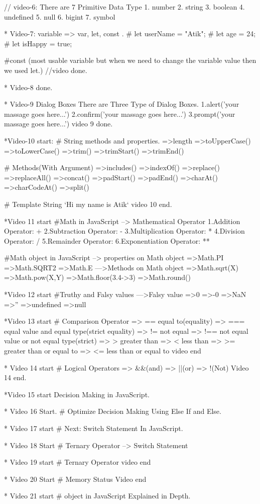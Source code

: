 // video-6: There are 7 Primitive Data Type
1. number
2. string
3. boolean
4. undefined
5. null
6. bigint
7. symbol

* Video-7: 
variable => var, let, const .
# let userName = "Atik";
# let age = 24;
# let isHappy = true;

#const (most usable variable but  when we need to change the variable value then we used let.)
//video done.

* Video-8 done.

* Video-9 
Dialog Boxes
There are Three Type of Dialog Boxes.
1.alert('your massage goes here...')
2.confirm('your massage goes here...')
3.prompt('your massage goes here...')
video 9 done.

*Video-10 start: 
# String methods and properties.
=>length
=>toUpperCase()
=>toLowerCase()
=>trim()
=>trimStart()
=>trimEnd()

# Methods(With Argument)
=>includes()
=>indexOf()
=>replace()
=>replaceAll()
=>concat()
=>padStart()
=>padEnd()
=>charAt()
=>charCodeAt()
=>split()

# Template String 
`Hi my name is Atik`
video 10 end.

*Video 11 start
#Math in JavaScript
--> Mathematical Operator
1.Addition Operator: +
2.Subtraction Operator: -
3.Multiplication Operator: *
4.Division Operator: /
5.Remainder Operator: %
6.Exponentiation Operator: **

#Math object in JavaScript
--> properties on Math object
=>Math.PI 
=>Math.SQRT2
=>Math.E
--->Methods on Math object
=>Math.sqrt(X)
=>Math.pow(X,Y)
=>Math.floor(3.4->3)
=>Math.round()

*Video 12 start
#Truthy and Falsy values
--->Falsy value
=>0
=>-0
=>NaN
=>''
=>undefined
=>null

*Video 13 start
# Comparison Operator
=> == equal to(equality)
=> === equal value and equal type(strict equality)
=> != not equal
=> !== not equal value or not equal type(strict)
=> > greater than
=> < less than
=> >= greater than or equal to 
=> <= less than or equal to
video end

* Video 14 start
# Logical Operators
=> &&(and)
=> ||(or)
=> !(Not)
Video 14 end.

*Video 15 start
Decision Making in JavaScript.

* Video 16 Start.
# Optimize Decision Making Using Else If and Else.

* Video 17 start
# Next: Switch Statement In JavaScript.

* Video 18 Start
# Ternary Operator
--> Switch Statement

* Video 19 start
# Ternary Operator
video end

* Video 20 Start
# Memory Status
 Video end

 * Video 21 start
 # object in JavaScript Explained in Depth.